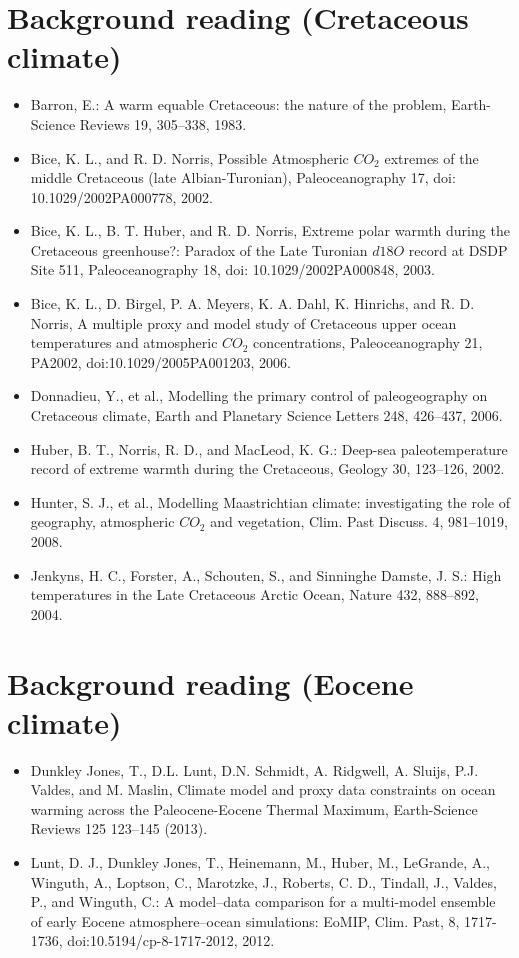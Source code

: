 \documentclass[11pt,fleqn]{book} %
\begin{document}
\section*{Background reading (Cretaceous climate)}
\begin{itemize}
\item Barron, E.: A warm equable Cretaceous: the nature of the problem, Earth-Science Reviews 19, 305–338, 1983.
\item Bice, K. L., and R. D. Norris, Possible Atmospheric \(CO_{2}\) extremes of the middle Cretaceous (late Albian-Turonian), Paleoceanography 17, doi: 10.1029/2002PA000778, 2002.
\item Bice, K. L., B. T. Huber, and R. D. Norris, Extreme polar warmth during the Cretaceous greenhouse?: Paradox of the Late Turonian \(d18O\) record at DSDP Site 511, Paleoceanography 18, doi: 10.1029/2002PA000848, 2003.
\item Bice, K. L., D. Birgel, P. A. Meyers, K. A. Dahl, K. Hinrichs, and R. D. Norris, A multiple proxy and model study of Cretaceous upper ocean temperatures and atmospheric \(CO_{2}\) concentrations, Paleoceanography 21, PA2002, doi:10.1029/2005PA001203, 2006.
\item Donnadieu, Y., et al., Modelling the primary control of paleogeography on Cretaceous climate, Earth and Planetary Science Letters 248, 426–437, 2006.
\item Huber, B. T., Norris, R. D., and MacLeod, K. G.: Deep-sea paleotemperature record of extreme warmth during the Cretaceous, Geology 30, 123–126, 2002.
\item Hunter, S. J., et al., Modelling Maastrichtian climate: investigating the role of geography, atmospheric \(CO_{2}\) and vegetation, Clim. Past Discuss. 4, 981–1019, 2008.
\item Jenkyns, H. C., Forster, A., Schouten, S., and Sinninghe Damste, J. S.: High temperatures in the Late Cretaceous Arctic Ocean, Nature 432, 888–892, 2004.
\end{itemize}

\section*{Background reading (Eocene climate)}
\begin{itemize}
\item Dunkley Jones, T., D.L. Lunt, D.N. Schmidt, A. Ridgwell, A. Sluijs, P.J. Valdes, and M. Maslin, Climate model and proxy data constraints on ocean warming across the Paleocene-Eocene Thermal Maximum, Earth-Science Reviews 125 123–145 (2013).
\item Lunt, D. J., Dunkley Jones, T., Heinemann, M., Huber, M., LeGrande, A., Winguth, A., Loptson, C., Marotzke, J., Roberts, C. D., Tindall, J., Valdes, P., and Winguth, C.: A model–data comparison for a multi-model ensemble of early Eocene atmosphere–ocean simulations: EoMIP, Clim. Past, 8, 1717-1736, doi:10.5194/cp-8-1717-2012, 2012.
\end{itemize}
\end{document}
